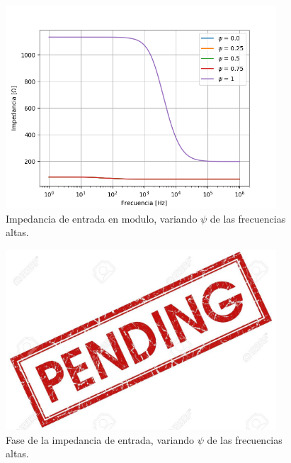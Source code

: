 \documentclass[a4paper]{article}
\begin{document}
\begin{figure}[H]
\centering
	\includegraphics[width=0.9\textwidth]{Imagenes/Zin-High-Mod.png}
	\caption{Impedancia de entrada en modulo, variando $\psi$ de las frecuencias altas.}
	\label{fig:bode_modulo_low}
\end{figure}

\begin{figure}[H]
\centering
	\includegraphics[width=0.9\textwidth]{Imagenes/Zin-High-Ph.png}
	\caption{Fase de la impedancia de entrada, variando $\psi$ de las frecuencias altas.}
	\label{fig:bode_ph_low}
\end{figure}
\end{document}
